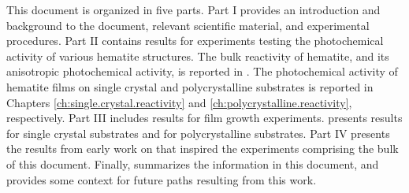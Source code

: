 This document is organized in five parts. Part I provides an introduction 
and background to the document, relevant scientific material, and 
experimental procedures. Part II contains results for experiments testing 
the photochemical activity of various hematite structures. The bulk 
reactivity of hematite, and its anisotropic photochemical activity, is 
reported in . The photochemical activity of 
hematite films on single crystal and polycrystalline substrates is reported 
in Chapters \ref{ch:single.crystal.reactivity} and 
\ref{ch:polycrystalline.reactivity}, respectively. Part III includes 
results for film growth experiments.  
presents results for single crystal substrates and  
 for polycrystalline substrates. Part IV 
presents the results from early work on  that inspired the 
experiments comprising the bulk of this document. Finally, 
 summarizes the information in this document, and 
provides some context for future paths resulting from this work.

